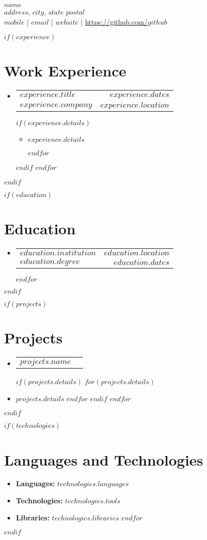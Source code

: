 \documentclass[letterpaper,10pt]{article}
\makeatletter
\newcommand{\resumeItem}[1]{
  \item\small{
    {#1 \vspace{-2pt}}
  }
}
\newcommand{\resumeSubheading}[4]{
  \vspace{-2pt}\item
    \begin{tabular*}{1.0\textwidth}[t]{l@{\extracolsep{\fill}}r}
      \textbf{#1} & \textbf{\small #2} \\
      \textit{\small#3} & \textit{\small #4} \\
    \end{tabular*}\vspace{-7pt}
}
\newcommand{\resumeProjectHeading}[1]{
    \item
    \begin{tabular*}{0.97\textwidth}{l@{\extracolsep{\fill}}r}
      \small#1  \\
    \end{tabular*}\vspace{-7pt}
}
\newcommand{\resumeSubHeadingListStart}{\begin{itemize}[leftmargin=0.0in, label={}]}
\newcommand{\resumeSubHeadingListEnd}{\end{itemize}}
\newcommand{\resumeItemListStart}{\begin{itemize}}
\newcommand{\resumeItemListEnd}{\end{itemize}\vspace{-5pt}}
\makeatother
\begin{document}
\begin{center}
    \textbf{\Huge \scshape $name$} \\ \vspace{1pt}
    $address$, $city$, $state$ $postal$ \\ \vspace{1pt}
    \small \raisebox{-0.1\height}$mobile$ | \href{mailto:$email$}{\underline{$email$}} |
    \href{https://$website$}{\underline{$website$}} |
    \href{https://github.com/$github$}{\underline{https://github.com/$github$}}
\end{center}

$if(experience)$
\section{Work Experience}
\resumeSubHeadingListStart
$for(experience)$
\resumeSubheading
  {$experience.title$}{$experience.dates$}
  {$experience.company$} {$experience.location$}
  $if(experience.details)$
  \resumeItemListStart 
    $for(experience.details)$
      \resumeItem{$experience.details$}
    $endfor$
  \resumeItemListEnd 
  $endif$
$endfor$
\resumeSubHeadingListEnd
$endif$

$if(education)$
\section{Education}
  \resumeSubHeadingListStart
  $for(education)$
    \resumeSubheading
    {$education.institution$}{$education.location$}
    {$education.degree$}{$education.dates$}
  $endfor$
  \resumeSubHeadingListEnd
$endif$

$if(projects)$
\section{Projects}
  \resumeSubHeadingListStart
  \vspace{-5pt}
  $for(projects)$
  \resumeProjectHeading
    {\textbf {$projects.name$}}
    $if(projects.details)$
    $for(projects.details)$
      \item\small{$projects.details$ \vspace{-2pt}}
    $endfor$
    $endif$
  $endfor$
  \vspace{-13pt}
  \resumeSubHeadingListEnd
$endif$


$if(technologies)$
\section{Languages and Technologies}
\resumeSubHeadingListStart
$for(technologies)$
\item\small{\textbf{Languages:} $technologies.languages$ \vspace{-2pt}}
\item\small{\textbf{Technologies:} $technologies.tools$}
\item\small{\textbf{Libraries:} $technologies.libraries$}
$endfor$
\resumeSubHeadingListEnd
$endif$
\end{document}
